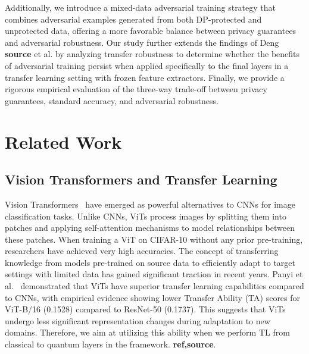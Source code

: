 \documentclass[11pt, conference]{IEEEtran}
\begin{document}
Additionally, we introduce a mixed-data adversarial training strategy that combines adversarial examples generated from both DP-protected and unprotected data, offering a more favorable balance between privacy guarantees and adversarial robustness. Our study further extends the findings of Deng \textbf{source} \cite{Deng} et al. by analyzing transfer robustness to determine whether the benefits of adversarial training persist when applied specifically to the final layers in a transfer learning setting with frozen feature extractors. Finally, we provide a rigorous empirical evaluation of the three-way trade-off between privacy guarantees, standard accuracy, and adversarial robustness.

\section{Related Work}

\subsection{Vision Transformers and Transfer Learning}
Vision Transformers~\cite{dosovitskiy2021image} have emerged as powerful alternatives to CNNs for image classification tasks. Unlike CNNs, ViTs process images by splitting them into patches and applying self-attention mechanisms to model relationships between these patches. When training a ViT on CIFAR-10 without any prior pre-training, researchers have achieved  very high accuracies. The concept of transferring knowledge from models pre-trained on source data to efficiently adapt to target settings with limited data has gained significant traction in recent years. Panyi et al.~\cite{panyi2022transferability} demonstrated that ViTs have superior transfer learning capabilities compared to CNNs, with empirical evidence showing lower Transfer Ability (TA) scores for ViT-B/16 (0.1528) compared to ResNet-50 (0.1737). This suggests that ViTs undergo less significant representation changes during adaptation to new domains. Therefore, we aim at utilizing this ability when we perform TL from classical to quantum layers in the framework. \textbf{ref,source}.
\end{document}
